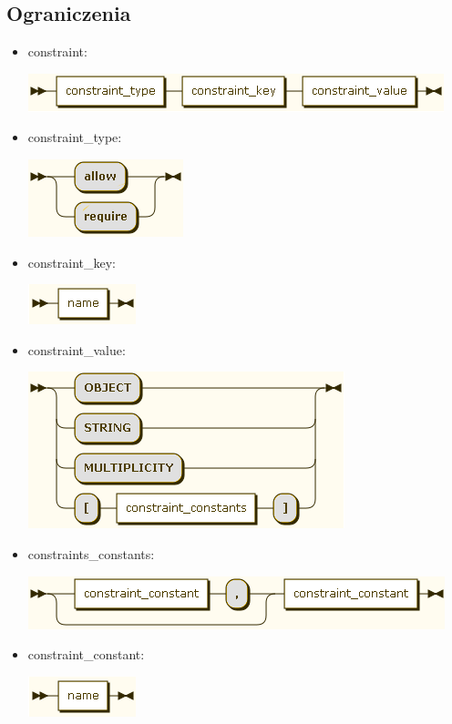 \subsection{Ograniczenia}
\begin{itemize}
\item constraint:

\includegraphics[scale=0.66]{images/grammar/constraint.png}

\item constraint\_type:

\includegraphics[scale=0.66]{images/grammar/constraint_type.png}

\item constraint\_key:

\includegraphics[scale=0.66]{images/grammar/name_xx.png}

\item constraint\_value:

\includegraphics[scale=0.66]{images/grammar/constraint_value.png}

\item constraints\_constants:

\includegraphics[scale=0.66]{images/grammar/constraint_constants.png}

\item constraint\_constant:

\includegraphics[scale=0.66]{images/grammar/name_xx.png}
\end{itemize}
